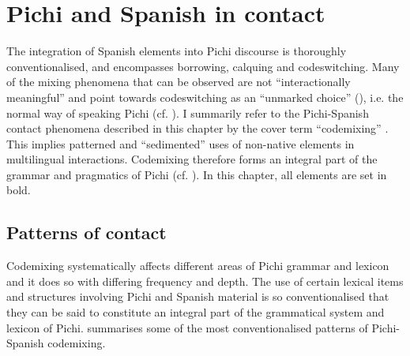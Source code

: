 \chapter{Pichi and Spanish in contact}
The integration of Spanish elements into Pichi discourse is thoroughly conventionalised, and encompasses borrowing, calquing and codeswitching. Many of the mixing phenomena that can be observed are not “interactionally meaningful” \citep[20]{Auer1998} and point towards codeswitching as an “unmarked choice” (\citealt{Scotton1993}), i.e. the normal way of speaking Pichi (cf. \citealt{Yakpo2015,Yakpo2017}). I summarily refer to the Pichi-Spanish contact phenomena described in this chapter by the cover term “codemixing” \citep{Muysken2000}. This implies patterned and “sedimented” \citep{Auer1999} uses of non-native elements in multilingual interactions. Codemixing therefore forms an integral part of the grammar and pragmatics of Pichi (cf. \citealt{Yakpo2009complexity,Yakpo2018}). In this chapter, all  elements are set in bold. 

\section{Patterns of contact}\label{sec:13.1}

Codemixing systematically affects different areas of Pichi grammar and lexicon and it does so with differing frequency and depth. The use of certain lexical items and structures involving Pichi and Spanish material is so conventionalised that they can be said to constitute an integral part of the grammatical system and lexicon of Pichi.  summarises some of the most conventionalised patterns of Pichi-Spanish codemixing.

